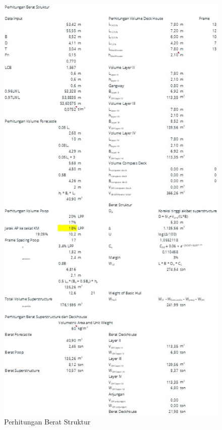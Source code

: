 \begin{figure}[!ht]
    \centering
    \includegraphics[width=0.95\linewidth,height=0.95\textheight,keepaspectratio]{lampiran/deskap-6.jpg}
    \caption*{Perhitungan Berat Struktur}
\end{figure}

